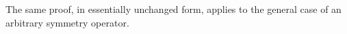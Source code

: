 The same proof, in essentially unchanged form, applies to the general case of an arbitrary symmetry operator.
